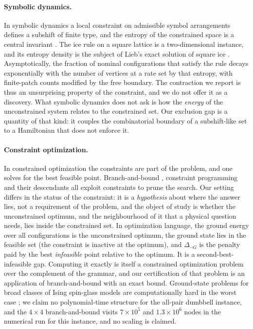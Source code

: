 \documentclass[11pt,a4paper]{article}
\theoremstyle{plain}
\theoremstyle{definition}
\theoremstyle{remark}
\newcommand{\dnG}{\Delta_{\neg G}}
\begin{document}
\paragraph{Symbolic dynamics.}
In symbolic dynamics a local constraint on admissible symbol arrangements defines a subshift of finite type, and the entropy of the constrained space is a central invariant \cite{LindMarcus1995}. The ice rule on a square lattice is a two-dimensional instance, and its entropy density is the subject of Lieb's exact solution of square ice \cite{Lieb1967}. Asymptotically, the fraction of nominal configurations that satisfy the rule decays exponentially with the number of vertices at a rate set by that entropy, with finite-patch counts modified by the free boundary. The contraction we report is thus an unsurprising property of the constraint, and we do not offer it as a discovery. What symbolic dynamics does not ask is how the \emph{energy} of the unconstrained system relates to the constrained set. Our exclusion gap is a quantity of that kind: it couples the combinatorial boundary of a subshift-like set to a Hamiltonian that does not enforce it.

\paragraph{Constraint optimization.}
In constrained optimization the constraints are part of the problem, and one solves for the best feasible point. Branch-and-bound \cite{LandDoig1960}, constraint programming and their descendants all exploit constraints to prune the search. Our setting differs in the status of the constraint: it is a \emph{hypothesis} about where the answer lies, not a requirement of the problem, and the object of study is whether the unconstrained optimum, and the neighbourhood of it that a physical question needs, lies inside the constrained set. In optimization language, the ground energy over all configurations is the unconstrained optimum, the ground state lies in the feasible set (the constraint is inactive at the optimum), and $\dnG$ is the penalty paid by the best \emph{infeasible} point relative to the optimum. It is a second-best-infeasible gap. Computing it exactly is itself a constrained optimization problem over the complement of the grammar, and our certification of that problem is an application of branch-and-bound with an exact bound. Ground-state problems for broad classes of Ising spin-glass models are computationally hard in the worst case \cite{Barahona1982}; we claim no polynomial-time structure for the all-pair dumbbell instance, and the $4\times4$ branch-and-bound visits $7\times10^{5}$ and $1.3\times10^{6}$ nodes in the numerical run for this instance, and no scaling is claimed.
\end{document}

